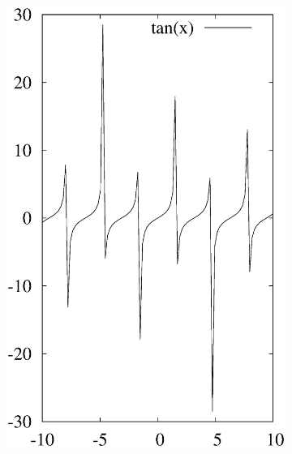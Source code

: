 \documentclass[letterpaper,showpacs,prb,preprint]{revtex4}
\begin{document}
\begin{figure}[ht]
\begin{subfigure}{0.3\textwidth}
\includegraphics [width=\textwidth]{tan.eps}

\end{subfigure}
\end{figure}
\end{document}
